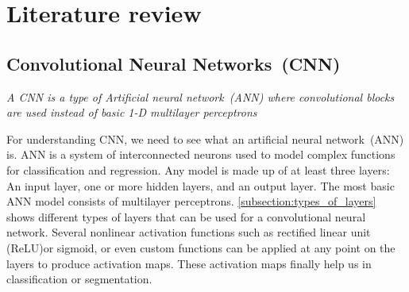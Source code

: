 \chapter{Literature review}\label{chapt:lit}
\section{Convolutional Neural Networks~(CNN)}
\textit{A CNN is a type of Artificial neural network~(ANN) where convolutional blocks are used instead of basic 1-D multilayer perceptrons}

For understanding CNN, we need to see what an artificial neural network~(ANN) is. ANN is a system of interconnected neurons used to model complex functions for classification and regression. Any model is made up of at least three layers: An input layer, one or more hidden layers, and an output layer. The most basic ANN model consists of multilayer perceptrons. \ref{subsection:types_of_layers} shows different types of layers that can be used for a convolutional neural network. Several nonlinear activation functions such as rectified linear unit (ReLU)or sigmoid, or even custom functions can be applied at any point on the layers to produce activation maps. These activation maps finally help us in classification or segmentation.

